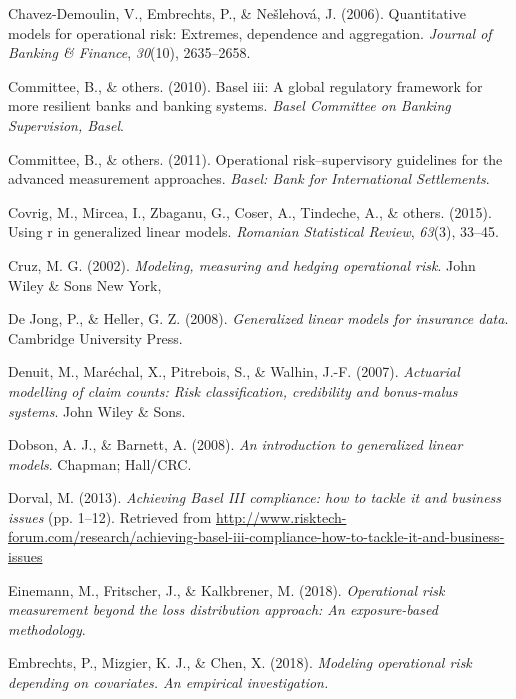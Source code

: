 \documentclass{DissertateUSU}
\begin{document}
\leavevmode\hypertarget{ref-chavez2006quantitative}{}%
Chavez-Demoulin, V., Embrechts, P., \& Nešlehová, J. (2006).
Quantitative models for operational risk: Extremes, dependence and
aggregation. \emph{Journal of Banking \& Finance}, \emph{30}(10),
2635--2658.

\leavevmode\hypertarget{ref-basel2010basel}{}%
Committee, B., \& others. (2010). Basel iii: A global regulatory
framework for more resilient banks and banking systems. \emph{Basel
Committee on Banking Supervision, Basel}.

\leavevmode\hypertarget{ref-basel2011operational}{}%
Committee, B., \& others. (2011). Operational risk--supervisory
guidelines for the advanced measurement approaches. \emph{Basel: Bank
for International Settlements}.

\leavevmode\hypertarget{ref-covrig2015using}{}%
Covrig, M., Mircea, I., Zbaganu, G., Coser, A., Tindeche, A., \& others.
(2015). Using r in generalized linear models. \emph{Romanian Statistical
Review}, \emph{63}(3), 33--45.

\leavevmode\hypertarget{ref-cruz2002modeling}{}%
Cruz, M. G. (2002). \emph{Modeling, measuring and hedging operational
risk}. John Wiley \& Sons New York,

\leavevmode\hypertarget{ref-de2008generalized}{}%
De Jong, P., \& Heller, G. Z. (2008). \emph{Generalized linear models
for insurance data}. Cambridge University Press.

\leavevmode\hypertarget{ref-denuit2007actuarial}{}%
Denuit, M., Maréchal, X., Pitrebois, S., \& Walhin, J.-F. (2007).
\emph{Actuarial modelling of claim counts: Risk classification,
credibility and bonus-malus systems}. John Wiley \& Sons.

\leavevmode\hypertarget{ref-dobson2008introduction}{}%
Dobson, A. J., \& Barnett, A. (2008). \emph{An introduction to
generalized linear models}. Chapman; Hall/CRC.

\leavevmode\hypertarget{ref-mysis2013}{}%
Dorval, M. (2013). \emph{Achieving Basel III compliance: how to tackle
it and business issues} (pp. 1--12). Retrieved from
\url{http://www.risktech-forum.com/research/achieving-basel-iii-compliance-how-to-tackle-it-and-business-issues}

\leavevmode\hypertarget{ref-einemann2018operational}{}%
Einemann, M., Fritscher, J., \& Kalkbrener, M. (2018). \emph{Operational
risk measurement beyond the loss distribution approach: An
exposure-based methodology}.

\leavevmode\hypertarget{ref-embrechts2018modeling}{}%
Embrechts, P., Mizgier, K. J., \& Chen, X. (2018). \emph{Modeling
operational risk depending on covariates. An empirical investigation.}
\end{document}

